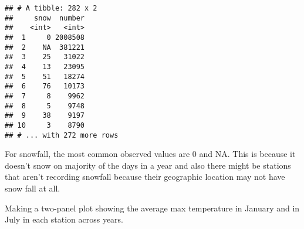 \documentclass[]{article}
\newenvironment{Shaded}{\begin{snugshade}}{\end{snugshade}}
\newcommand{\KeywordTok}[1]{\textcolor[rgb]{0.13,0.29,0.53}{\textbf{#1}}}
\newcommand{\DataTypeTok}[1]{\textcolor[rgb]{0.13,0.29,0.53}{#1}}
\newcommand{\DecValTok}[1]{\textcolor[rgb]{0.00,0.00,0.81}{#1}}
\newcommand{\StringTok}[1]{\textcolor[rgb]{0.31,0.60,0.02}{#1}}
\newcommand{\OtherTok}[1]{\textcolor[rgb]{0.56,0.35,0.01}{#1}}
\newcommand{\OperatorTok}[1]{\textcolor[rgb]{0.81,0.36,0.00}{\textbf{#1}}}
\newcommand{\NormalTok}[1]{#1}
\begin{document}
\begin{verbatim}
## # A tibble: 282 x 2
##     snow  number
##    <int>   <int>
##  1     0 2008508
##  2    NA  381221
##  3    25   31022
##  4    13   23095
##  5    51   18274
##  6    76   10173
##  7     8    9962
##  8     5    9748
##  9    38    9197
## 10     3    8790
## # ... with 272 more rows
\end{verbatim}

For snowfall, the most common observed values are 0 and NA. This is
because it doesn't snow on majority of the days in a year and also there
might be stations that aren't recording snowfall because their
geographic location may not have snow fall at all.

Making a two-panel plot showing the average max temperature in January
and in July in each station across years.

\begin{Shaded}
\end{Shaded}
\end{document}
